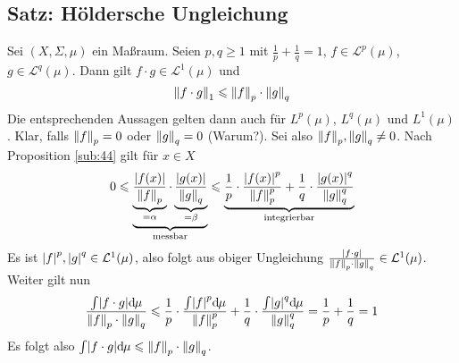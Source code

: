 \subsection{Satz: Höldersche Ungleichung} %
\label{sub:45}
Sei $(X,\Sigma,\mu)$ ein Maßraum. Seien $p,q \ge 1$ mit $\frac{1}{p} +\frac{1}{q}=1 $, $f \in \mathcal{L}^p(\mu)$, $g \in \mathcal{L}^q(\mu)$. Dann gilt 
$f \cdot g \in \mathcal{L}^1(\mu)$ und
\[
	\norm[1]{f \cdot g} \le \norm[p]{f} \cdot \norm[q]{g}   
\]
Die entsprechenden Aussagen gelten dann auch für $L^p(\mu)$, $L^q(\mu)$ und $L^1(\mu)$.
Klar, falls $\norm[p]{f} =0 $ oder $\norm[q]{g} =0$ (Warum?). Sei also $\norm[p]{f}, \norm[q]{g} \not= 0$. Nach Proposition \ref{sub:44} gilt für $x \in X$
\[
	0 \le \underbrace{\underbrace{\frac{\abs*{f(x)} }{\norm[p]{f}}}_{=\alpha} \cdot \underbrace{\frac{\abs*{g(x)} }{\norm[q]{g} }}_{=\beta} }_{\text{messbar}}
	\le \underbrace{\frac{1}{p} \cdot \frac{\abs*{f(x)}^p }{\norm[p]{f}^p } + \frac{1}{q} \cdot \frac{\abs*{g(x)}^q }{\norm[q]{g}^q }}_{\text{integrierbar}}
\]
Es ist $\abs*{f}^p , \abs*{g}^q  \in \mathcal{L}^1(\mu)$, also folgt aus obiger Ungleichung 
$\frac{\abs*{ f \cdot g }}{\norm[p]{f} \cdot \norm[q]{g}}  \in \mathcal{L}^1(\mu)$. Weiter gilt nun
\begin{align*}
	\frac{\int \abs*{f \cdot g} \mathd \mu}{\norm[p]{f} \cdot \norm[q]{g}} \le \frac{1}{p} \cdot \frac{\int \abs*{f}^p \mathd \mu }{\norm[p]{f}^p } +
	\frac{1}{q} \cdot \frac{\int \abs*{g}^q \mathd \mu }{\norm[q]{g}^q} = \frac{1}{p} + \frac{1}{q} = 1       
\end{align*}
Es folgt also $\int \abs*{f \cdot g} \mathd \mu  \le \norm[p]{f}  \cdot \norm[q]{g}$. \bewende

